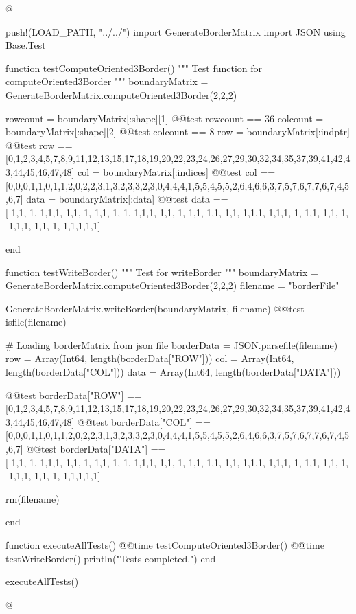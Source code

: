 \documentclass[11pt,oneside]{article}	%
\begin{document}
@{push!(LOAD_PATH, "../../")
import GenerateBorderMatrix
import JSON
using Base.Test

function testComputeOriented3Border()
  """
  Test function for computeOriented3Border
  """
  boundaryMatrix = GenerateBorderMatrix.computeOriented3Border(2,2,2)

  rowcount = boundaryMatrix[:shape][1]
  @@test rowcount == 36
  colcount = boundaryMatrix[:shape][2]
  @@test colcount == 8
  row = boundaryMatrix[:indptr]
  @@test row == [0,1,2,3,4,5,7,8,9,11,12,13,15,17,18,19,20,22,23,24,26,27,29,30,32,34,35,37,39,41,42,43,44,45,46,47,48]
  col = boundaryMatrix[:indices]
  @@test col == [0,0,0,1,1,0,1,1,2,0,2,2,3,1,3,2,3,3,2,3,0,4,4,4,1,5,5,4,5,5,2,6,4,6,6,3,7,5,7,6,7,7,6,7,4,5,6,7]
  data = boundaryMatrix[:data]
  @@test data == [-1,1,-1,-1,1,1,-1,1,-1,-1,1,-1,-1,-1,1,1,-1,1,-1,-1,1,-1,1,-1,1,-1,1,1,-1,1,1,-1,-1,1,-1,1,-1,-1,1,1,-1,1,-1,-1,1,1,1,1]

end

function testWriteBorder()
  """
  Test for writeBorder
  """
  boundaryMatrix = GenerateBorderMatrix.computeOriented3Border(2,2,2)
  filename = "borderFile"

  GenerateBorderMatrix.writeBorder(boundaryMatrix, filename)
  @@test isfile(filename)

  # Loading borderMatrix from json file
  borderData = JSON.parsefile(filename)
  row = Array(Int64, length(borderData["ROW"]))
  col = Array(Int64, length(borderData["COL"]))
  data = Array(Int64, length(borderData["DATA"]))

  @@test borderData["ROW"] == [0,1,2,3,4,5,7,8,9,11,12,13,15,17,18,19,20,22,23,24,26,27,29,30,32,34,35,37,39,41,42,43,44,45,46,47,48]
  @@test borderData["COL"] == [0,0,0,1,1,0,1,1,2,0,2,2,3,1,3,2,3,3,2,3,0,4,4,4,1,5,5,4,5,5,2,6,4,6,6,3,7,5,7,6,7,7,6,7,4,5,6,7]
  @@test borderData["DATA"] == [-1,1,-1,-1,1,1,-1,1,-1,-1,1,-1,-1,-1,1,1,-1,1,-1,-1,1,-1,1,-1,1,-1,1,1,-1,1,1,-1,-1,1,-1,1,-1,-1,1,1,-1,1,-1,-1,1,1,1,1]

  rm(filename)

end

function executeAllTests()
  @@time testComputeOriented3Border()
  @@time testWriteBorder()
  println("Tests completed.")
end

executeAllTests()

@}
\end{document}
